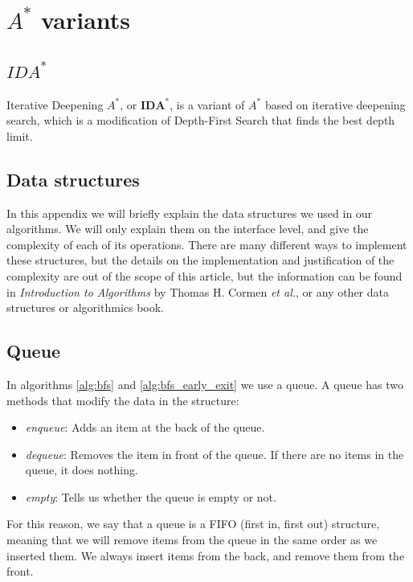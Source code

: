 \documentclass[12pt]{report}
\begin{document}


\chapter{$A^*$ variants}

\section{$IDA^*$}
Iterative Deepening $A^*$, or $\bm{IDA^*}$, is a variant of $A^*$ based on iterative deepening search, which is a modification of Depth-First Search that finds the best depth limit. %




\begin{appendices}

\chapter{Data structures}

In this appendix we will briefly explain the data structures we used in our algorithms. We will only explain them on the interface level, and give the complexity of each of its operations. There are many different ways to implement these structures, but the details on the implementation and justification of the complexity are out of the scope of this article, but the information can be found in \emph{Introduction to Algorithms} by Thomas H. Cormen \textit{et al.}, or any other data structures or algorithmics book.

\section{Queue}
In algorithms \ref{alg:bfs} and \ref{alg:bfs_early_exit} we use a queue. A queue has two methods that modify the data in the structure:
\begin{itemize}
\item \emph{enqueue}: Adds an item at the back of the queue.
\item \emph{dequeue}: Removes the item in front of the queue. If there are no items in the queue, it does nothing.
\item \emph{empty}: Tells us whether the queue is empty or not.
\end{itemize}
For this reason, we say that a queue is a FIFO (first in, first out) structure, meaning that we will remove items from the queue in the same order as we inserted them. We always insert items from the back, and remove them from the front.


\end{appendices}
\end{document}

